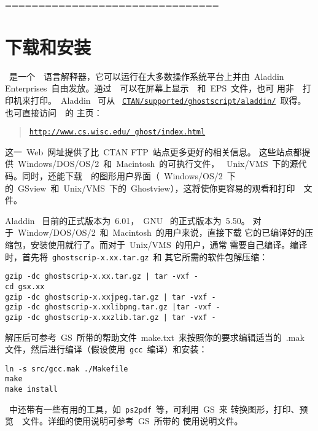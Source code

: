 ================================
\section[下载和安装\GS]{下载和安装~~\GS}\label{sec:gs}

\GS~是一个~\PS~语言解释器，它可以运行在大多数操作系统平台上并由~Aladdin
Enterprises~自由发放。通过~\GS~可以在屏幕上显示~\PS~和~EPS~文件，也可
用非~\PS~打印机来打印。~Aladdin \GS~可从
~\href{ftp://ftp.ctan.tug/tex-archive/supported/ghostscript/aladdin/}%
{\texttt{CTAN/supported/ghostscript/aladdin/}}~取得。也可直接访问~\GS~的
主页：
\begin{quote}
	\href{http://www.cs.wisc.edu/~ghost/index.html}{\texttt{http://www.cs.wisc.edu/~ghost/index.html}}
\end{quote}
这一~Web~网址提供了比~CTAN FTP~站点更多更好的相关信息。
这些站点都提供~Windows/DOS/OS{\small /}2~和~Macintosh~的可执行文件，
~Unix/VMS~下的源代码。同时，还能下载~\GS~的图形用户界面（~Windows/OS/2~下
的~GSview~和~Unix/VMS~下的~Ghostview），这将使你更容易的观看和打印~\PS~文件。

Aladdin \GS~目前的正式版本为~6.01，~GNU \GS~的正式版本为~5.50。
对于~Window/DOS/OS{\small /}2~和~Macintosh~的用户来说，直接下载
它的已编译好的压缩包，安装使用就行了。而对于~Unix/VMS~的用户，通常
需要自己编译。编译时，首先将~\texttt{ghostscrip-x.xx.tar.gz}~和
其它所需的软件包解压缩：
\begin{Verbatim}[xleftmargin=1cm]
gzip -dc ghostscrip-x.xx.tar.gz | tar -vxf -
cd gsx.xx
gzip -dc ghostscrip-x.xxjpeg.tar.gz | tar -vxf -
gzip -dc ghostscrip-x.xxlibpng.tar.gz |tar -vxf -
gzip -dc ghostscrip-x.xxzlib.tar.gz | tar -vxf -
\end{Verbatim}
解压后可参考~GS~所带的帮助文件~make.txt~来按照你的要求编辑适当的~.mak~
文件，然后进行编译（假设使用~\texttt{gcc}~编译）和安装：
\begin{Verbatim}[xleftmargin=1cm]
ln -s src/gcc.mak ./Makefile
make
make install
\end{Verbatim}

\GS~中还带有一些有用的工具，如~\texttt{ps2pdf}~等，可利用~GS~来
转换图形，打印、预览~\PS~文件。详细的使用说明可参考~GS~所带的
使用说明文件。

